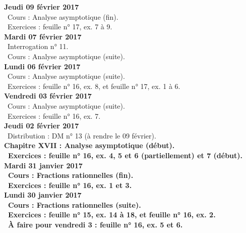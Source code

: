 \documentclass[12pt,a4paper]{article}
\begin{document}
\noindent\textbf{Jeudi 09 février 2017}\\
\bu\ Cours : Analyse asymptotique (fin).\\
\bu\ Exercices : feuille n° 17, ex. 7 à 9.\vspace{.4cm}\\

\noindent\textbf{\bf Mardi 07 février 2017} \\
\bu\ Interrogation n° 11.\\
\bu\ Cours : Analyse asymptotique (suite).\vspace{.4cm}\\

\noindent\textbf{\bf Lundi 06 février 2017} \\
\bu\ Cours : Analyse asymptotique (suite).\\
\bu\ Exercices : feuille n° 16, ex. 8, et feuille n° 17, ex. 1 à 6.\vspace{.4cm}\\

\noindent\textbf{Vendredi 03 février 2017}\\
\bu\ Cours : Analyse asymptotique (suite).\\
\bu\ Exercices : feuille n° 16, ex. 7.\vspace{.4cm}\\

\noindent\textbf{Jeudi 02 février 2017}\\
\bu\ Distribution : DM n° 13 (à rendre le 09 février).\\
\bf Chapitre XVII \rm : Analyse asymptotique (début).\\
\bu\ Exercices : feuille n° 16, ex. 4, 5 et 6 (partiellement) et 7 (début).\vspace{.4cm}\\

\noindent\textbf{ Mardi 31 janvier 2017} \\
\bu\ Cours : Fractions rationnelles (fin).\\
\bu\ Exercices : feuille n° 16, ex. 1 et 3.\vspace{.4cm}\\

\noindent\textbf{ Lundi 30 janvier 2017} \\
\bu\ Cours : Fractions rationnelles (suite).\\
\bu\ Exercices : feuille n° 15, ex. 14 à 18, et feuille n° 16, ex. 2.\\
\bu\ À faire pour vendredi 3 : feuille n° 16, ex. 5 et 6.\vspace{.4cm}\\ 
\end{document}
